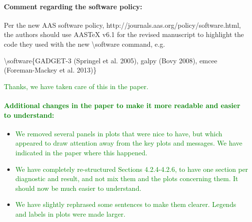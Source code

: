 \documentclass[10pt,a4paper]{article}
\newcommand{\Answer}[1]{\textcolor{Green}{#1}}
\begin{document}
\paragraph{Comment regarding the software policy:}

Per the new AAS software policy, http://journals.aas.org/policy/software.html, the
authors should use AASTeX v6.1 for the revised manuscript to highlight the code they
used with the new {\textbackslash}software command, e.g.

{\textbackslash}software\{GADGET-3 (Springel et al. 2005), galpy (Bovy 2008), emcee (Foreman-Mackey
et al. 2013)\}

\Answer{Thanks, we have taken care of this in the paper.}

\paragraph{\Answer{Additional changes in the paper to make it more readable and easier to understand:}}
\begin{itemize}
\item \Answer{We removed several panels in plots that were nice to have, but which appeared to draw attention away from the key plots and messages. We have indicated in the paper where this happened.}
\item \Answer{We have completely re-structured Sections 4.2.4-4.2.6, to have one section per diagnostic and result, and not mix them and the plots concerning them. It should now be much easier to understand.}
\item \Answer{We have slightly rephrased some sentences to make them clearer. Legends and labels in plots were made larger.}
\end{itemize}
\end{document}
